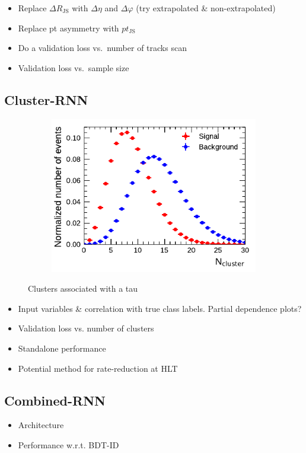 \begin{itemize}
\item Replace $\Delta R_\mathrm{JS}$ with $\Delta \eta$ and $\Delta \varphi$
  (try extrapolated \& non-extrapolated)
\item Replace pt asymmetry with $pt_\mathrm{JS}$
\item Do a validation loss vs.\ number of tracks scan
\item Validation loss vs.\ sample size
\end{itemize}

\subsection{Cluster-RNN}
\label{sec:rnn_clusters}

\begin{figure}[ht]
  \begin{subfigure}{0.5\textwidth}
    \centering
    \includegraphics{./figures/rnn/ncls_1p.pdf}
  \end{subfigure}%
  \begin{subfigure}{0.5\textwidth}
    \centering
  \end{subfigure}
  \caption{Clusters associated with a tau}
  \label{fig:rnn_nclusters}
\end{figure}

\begin{itemize}
\item Input variables \& correlation with true class labels. Partial
  dependence plots?
\item Validation loss vs. number of clusters
\item Standalone performance
\item Potential method for rate-reduction at HLT
\end{itemize}


\subsection{Combined-RNN}
\label{sec:rnn_combined}

\begin{itemize}
\item Architecture
\item Performance w.r.t. BDT-ID
\end{itemize}


